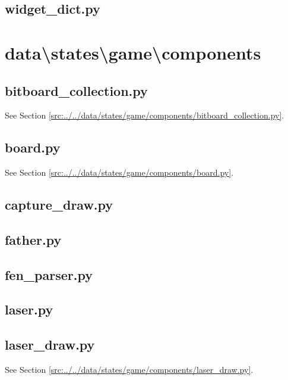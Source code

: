 \documentclass[../main/main.tex]{subfiles}
\begin{document}
\subsection{widget\_dict.py}

\label{src:data/states/game/widget_dict.py}

\section{data\textbackslash states\textbackslash game\textbackslash components}
\subsection{bitboard\_collection.py}
See Section \ref{src:../../data/states/game/components/bitboard_collection.py}.

\subsection{board.py}
See Section \ref{src:../../data/states/game/components/board.py}.

\subsection{capture\_draw.py}

\label{src:data/states/game/components/capture_draw.py}

\subsection{father.py}

\label{src:data/states/game/components/father.py}

\subsection{fen\_parser.py}

\label{src:data/states/game/components/fen_parser.py}

\subsection{laser.py}

\label{src:data/states/game/components/laser.py}

\subsection{laser\_draw.py}
See Section \ref{src:../../data/states/game/components/laser_draw.py}.
\end{document}
